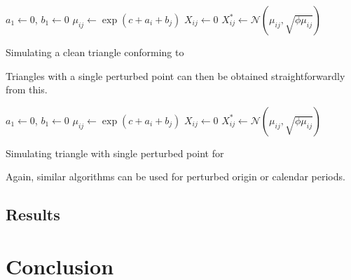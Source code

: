 \documentclass[a4paper]{book}
\begin{document}
\begin{algorithm}[H]
  \begin{algorithmic}
    \State $a_1 \gets 0$, $b_1 \gets 0$
      \State $\mu_{ij} \gets \exp(c + a_i + b_j)$
      \State $X_{ij} \gets 0$
    \EndFor
        \State $X^*_{ij} \gets \mathcal{N}(\mu_{ij}, \sqrt{\phi \mu_{ij}})$
      \EndFor
    \EndFor
    \State {}
  \end{algorithmic}
  \caption{Simulating a clean triangle conforming to }
  \label{alg:clean-odp-triangle}
\end{algorithm}

Triangles with a single perturbed point can then be obtained straightforwardly from this.

\begin{algorithm}[H]
  \begin{algorithmic}
    \State $a_1 \gets 0$, $b_1 \gets 0$
      \State $\mu_{ij} \gets \exp(c + a_i + b_j)$
      \State $X_{ij} \gets 0$
    \EndFor
        \State $X^*_{ij} \gets \mathcal{N}(\mu_{ij}, \sqrt{\phi \mu_{ij}})$
      \EndFor
    \EndFor
    \State {}
  \end{algorithmic}
  \caption{Simulating triangle with single perturbed point for }
\end{algorithm}

Again, similar algorithms can be used for perturbed origin or calendar periods.

\section{Results}

\backmatter%

\chapter{Conclusion} \label{conclusion}

\printbibliography%
\end{document}
